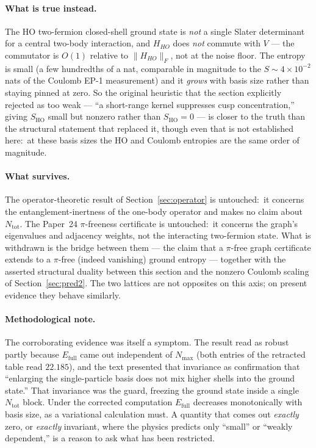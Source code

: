 \documentclass[twocolumn,pra,amsmath,amssymb,superscriptaddress]{revtex4-2}
\begin{document}
\paragraph*{What is true instead.}  The HO two-fermion closed-shell
ground state is \emph{not} a single Slater determinant for a central
two-body interaction, and $H_{HO}$ does \emph{not} commute with $V$ ---
the commutator is $O(1)$ relative to $\lVert H_{HO}\rVert_F$, not at
the noise floor.  The entropy is small (a few hundredths of a nat,
comparable in magnitude to the $S \sim 4\times10^{-2}$ nats of the
Coulomb EP-1 measurement) and it \emph{grows} with basis size rather
than staying pinned at zero.  So the original heuristic that the
section explicitly rejected as too weak --- ``a short-range kernel
suppresses cusp concentration,'' giving
$S_{\mathrm{HO}}$ small but nonzero rather than
$S_{\mathrm{HO}} = 0$ --- is closer to the truth than the structural
statement that replaced it, though even that is not established here:\
at these basis sizes the HO and Coulomb entropies are the same order of
magnitude.

\paragraph*{What survives.}  The operator-theoretic result of
Section~\ref{sec:operator} is untouched:\ it concerns the
entanglement-inertness of the one-body operator and makes no claim
about $N_{\mathrm{tot}}$.  The Paper~24 $\pi$-freeness certificate is
untouched:\ it concerns the graph's eigenvalues and adjacency weights,
not the interacting two-fermion state.  What is withdrawn is the bridge
between them --- the claim that a $\pi$-free graph certificate extends
to a $\pi$-free (indeed vanishing) ground entropy --- together with the
asserted structural duality between this section and the nonzero
Coulomb scaling of Section~\ref{sec:pred2}.  The two lattices are not
opposites on this axis; on present evidence they behave similarly.

\paragraph*{Methodological note.}  The corroborating evidence was itself
a symptom.  The result read as robust partly because $E_{\mathrm{full}}$
came out independent of $N_{\max}$ (both entries of the retracted table
read $22.185$), and the text presented that invariance as confirmation
that ``enlarging the single-particle basis does not mix higher shells
into the ground state.''  That invariance was the guard, freezing the
ground state inside a single $N_{\mathrm{tot}}$ block.  Under the
corrected computation $E_{\mathrm{full}}$ decreases monotonically with
basis size, as a variational calculation must.  A quantity that comes
out \emph{exactly} zero, or \emph{exactly} invariant, where the physics
predicts only ``small'' or ``weakly dependent,'' is a reason to ask what
has been restricted.
\end{document}

